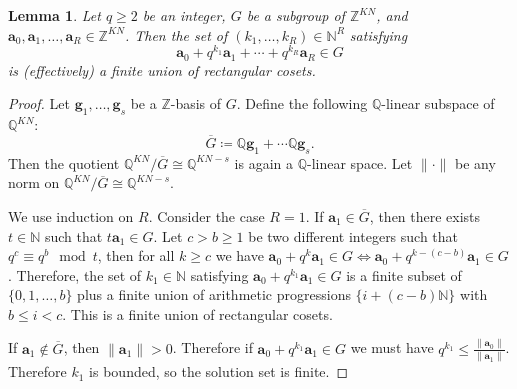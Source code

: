 \documentclass[letterpaper, 11pt, thm-restate]{article}
\numberwithin{equation}{section}
\newcommand{\Z}{\mathbb{Z}}
\newcommand{\N}{\mathbb{N}}
\newcommand{\Q}{\mathbb{Q}}
\newcommand{\ba}{\boldsymbol{a}}
\newcommand{\bg}{\boldsymbol{g}}
\newcommand{\oG}{\overline{G}}
\newtheorem{lem}[thrm]{Lemma}
\theoremstyle{definition}
\theoremstyle{definition}
\theoremstyle{definition}
\begin{document}
\begin{lem}\label{lem:rectangular}
    Let $q \geq 2$ be an integer, $G$ be a subgroup of $\Z^{KN}$, and $\ba_0, \ba_1, \ldots, \ba_R \in \Z^{KN}$.
    Then the set of $(k_1, \ldots, k_R) \in \N^R$ satisfying
    \begin{equation}\label{eq:recinG}
        \ba_0 + q^{k_1} \ba_1 + \cdots + q^{k_R} \ba_R \in G
    \end{equation}
    is (effectively) a finite union of rectangular cosets. 
\end{lem}
\begin{proof}
    Let $\bg_1, \ldots, \bg_s$ be a $\Z$-basis of $G$.
    Define the following $\Q$-linear subspace of $\Q^{KN}$:
    \[
    \oG \coloneqq \Q \bg_1 + \cdots \Q \bg_s.
    \]
    Then the quotient $\Q^{KN}/\oG \cong \Q^{KN - s}$ is again a $\Q$-linear space.
    Let $\|\cdot\|$ be any norm on $\Q^{KN}/\oG \cong \Q^{KN - s}$.
    
    We use induction on $R$.
    Consider the case $R = 1$.
    If $\ba_1 \in \oG$, then there exists $t \in \N$ such that $t \ba_1 \in G$.
    Let $c > b \geq 1$ be two different integers such that $q^c \equiv q^b \mod t$, then for all $k \geq c$ we have $\ba_0 + q^{k} \ba_1 \in G \iff \ba_0 + q^{k - (c - b)} \ba_1 \in G$.
    Therefore, the set of $k_1 \in \N$ satisfying $\ba_0 + q^{k_1} \ba_1 \in G$ is a finite subset of $\{0, 1, \ldots, b\}$ plus a finite union of arithmetic progressions $\{i + (c- b) \N\}$ with $b \leq i < c$.
    This is a finite union of rectangular cosets.

    If $\ba_1 \notin \oG$, then $\|\ba_1\| > 0$. Therefore if $\ba_0 + q^{k_1} \ba_1 \in G$ we must have $q^{k_1} \leq \frac{\|\ba_0\|}{\|\ba_1\|}$.
    Therefore $k_1$ is bounded, so the solution set is finite.


\end{proof}
\end{document}
